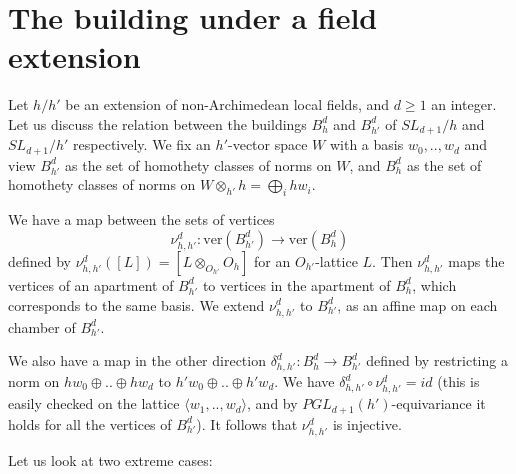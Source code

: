 \documentclass{amsart}
\theoremstyle{theorem}
\theoremstyle{lemma}
\theoremstyle{prop}
\theoremstyle{definition}
\theoremstyle{corollary}
\theoremstyle{remark}
\newcommand{\h}{h}
\begin{document}
\section{The building under a field extension}

Let $h/h'$ be an extension of non-Archimedean local fields, and $d\geq 1$ an integer. Let us discuss the relation between the buildings $B^d_h$ and $B^d_{h'}$ of $SL_{d+1}/\h$ and $SL_{d+1}/{h'}$ respectively. We fix an $h'$-vector space $W$ with a basis $w_0,..,w_d$ and view $B^d_{h'}$ as the set of homothety classes of norms on $W$, and $B^d_h$ as the set of homothety classes of norms on $W \otimes_{\h'} \h = \bigoplus_i h w_i$.

We have a map between the sets of vertices $$ \nu^d_{\h,\h'} : \text{ver}(B^d_{\h'}) \rightarrow \text{ver}(B^d_\h)$$ defined by
$ \nu^d_{\h,\h'}([L]) = [L\otimes_{O_{\h'}}O_\h] $ for an $O_{\h'}$-lattice $L$. Then $\nu^d_{h,h'}$ maps the vertices of an apartment of $B^d_{h'}$ to vertices in the apartment of $B^d_h$, which corresponds to the same basis. We extend $ \nu^d_{\h,\h'}$ to $B^d_{\h'}$, as an affine map on each chamber of $B^d_{\h'}$.

We also have a map in the other direction $\delta^d_{\h,\h'}: B^d_{\h} \rightarrow B^d_{\h'}$ defined by restricting a norm on $\h w_0 \oplus .. \oplus \h w_d$ to $\h'w_0 \oplus .. \oplus \h'w_d$. We have $\delta^d_{\h,\h'} \circ  \nu^d_{\h,\h'} = id$ (this is easily checked on the lattice $\langle w_1,..,w_d\rangle$, and by $PGL_{d+1}(\h')$-equivariance it holds for all the vertices of $B^d_{\h'}$). It follows that $\nu^d_{\h,\h'}$ is injective.

Let us look at two extreme cases:
\end{document}
